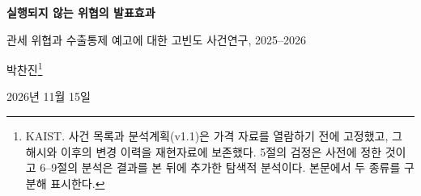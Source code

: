 \documentclass[11pt,a4paper]{article}
\begin{document}
\thispagestyle{first}
\begin{center}
{\LARGE\bfseries 실행되지 않는 위협의 발표효과\par}
\vspace{9pt}
{\large 관세 위협과 수출통제 예고에 대한 고빈도 사건연구, 2025--2026\par}
\vspace{20pt}
{\large 박찬진\footnote{KAIST. 사건 목록과 분석계획(v1.1)은 가격 자료를 열람하기 전에 고정했고, 그 해시와 이후의 변경 이력을 재현자료에 보존했다. 5절의 검정은 사전에 정한 것이고 6--9절의 분석은 결과를 본 뒤에 추가한 탐색적 분석이다. 본문에서 두 종류를 구분해 표시한다.}\par}
\vspace{6pt}
{\normalsize 2026년 11월 15일\par}
\end{center}
\end{document}
